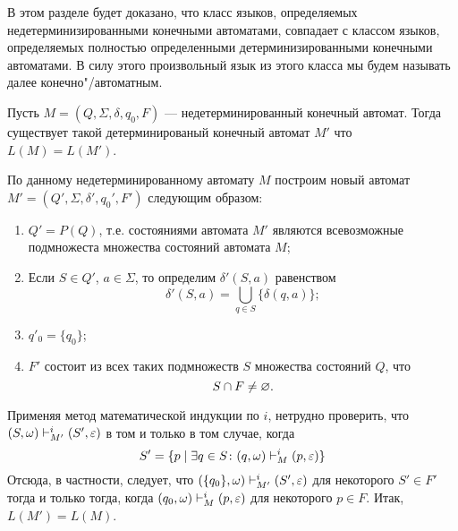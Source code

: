 В этом разделе будет доказано, что класс языков, определяемых недетерминизированными конечными автоматами, совпадает с классом языков, определяемых полностью определенными детерминизированными конечными автоматами. В силу этого произвольный язык из этого класса мы будем называть далее конечно"/автоматным.

\begin{mytheorem}
\label{theorem-reduction-NKAtoDKA}
Пусть $M=(Q,\Sigma,\delta,q_0,F)$ --- недетерминированный конечный автомат. Тогда существует такой детерминированый конечный автомат $M'$ что $L(M) = L(M')$.
\end{mytheorem}

\begin{myproof}
По данному недетерминированному автомату $M$ построим новый автомат $M'=(Q',\Sigma,\delta ',q_0',F')$ следующим образом:
\begin{enumerate}
\item $Q'=P(Q)$, т.е. состояниями автомата $M'$ являются всевозможные подмножеста множества состояний автомата $M$;
\item Если $S\in Q'$, $a\in\Sigma$, то определим $\delta '(S,a)$ равенством
\[
	\delta '(S,a) = \bigcup_{q\in S} \{\delta(q,a)\};
\]

\item $q'_0=\{q_0\}$;

\item $F'$ состоит из всех таких подмножеств $S$ множества состояний $Q$, что \[
	S\cap F\neq\varnothing.
\]
\end{enumerate}
Применяя метод математической индукции по $i$, нетрудно проверить, что $(S,\omega)\vdash_{M'}^i(S',\varepsilon)$ в том и только в том случае, когда
\[
S'=\{p\mid\exists q\in S\colon (q,\omega)\vdash_M^i(p,\varepsilon)\}
\]
Отсюда, в частности, следует, что $(\{q_0\},\omega)\vdash_{M'}^i(S',\varepsilon)$ для некоторого $S'\in F'$ тогда и только тогда, когда $(q_0,\omega)\vdash_M^i(p,\varepsilon)$ для некоторого $p\in F$. Итак, $L(M')=L(M)$.
\end{myproof}

